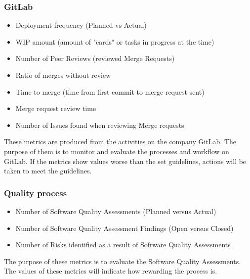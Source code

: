 \subsubsection{GitLab}
\begin{itemize}
    \item Deployment frequency (Planned vs Actual)
    \item WIP amount (amount of "cards" or tasks in progress at the time)
    \item Number of Peer Reviews (reviewed Merge Requests)
    \item Ratio of merges without review
    \item Time to merge (time from first commit to merge request sent)
    \item Merge request review time
    \item Number of Issues found when reviewing Merge requests
\end{itemize}
These metrics are produced from the activities on the company GitLab. The purpose of them is to monitor and evaluate the processes and workflow on GitLab. If the metrics show values worse than the set guidelines, actions will be taken to meet the guidelines.

\subsubsection{Quality process}
\begin{itemize}    
    \item Number of Software Quality Assessments (Planned versus Actual)
    \item Number of Software Quality Assessment Findings (Open versus Closed)
    \item Number of Risks identified as a result of Software Quality Assessments
\end{itemize}
The purpose of these metrics is to evaluate the Software Quality Assessments. The values of these metrics will indicate how rewarding the process is.